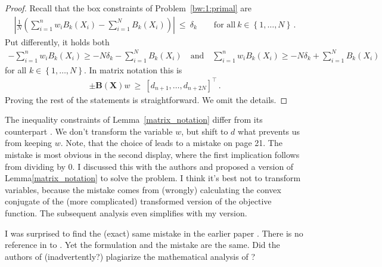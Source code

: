 \begin{proof}
  Recall that the box constraints of Problem~\ref{bw:1:primal} are
  \begin{gather*}
        \left| 
      \frac{1}{N} 
      \left( 
      \sum_{i = 1}^{n} 
      w_i
      B_k(X_i)
      -
      \sum_{i=1}^{N} 
      B_k(X_i)
      \right)
    \right|
    \ 
    \le 
    \ 
    \delta_k
    \qquad
    \text{for all}\ 
    k\in \left\{ 1,\ldots, N \right\}
    \,.
  \end{gather*}
  Put differently, it holds both
  \begin{align*}
    -
      \sum_{i = 1}^{n} 
      w_i
      B_k(X_i)
    \ge 
    -
    N
    \delta_k
      -
      \sum_{i=1}^{N} 
      B_k(X_i)
      \quad 
    \text{and}
      \quad
      \sum_{i = 1}^{n} 
      w_i
      B_k(X_i)
    \ge 
    -
    N
    \delta_k
      +
      \sum_{i=1}^{N} 
      B_k(X_i)
  \end{align*}
  for all 
  $
    k\in \left\{ 1,\ldots, N \right\}
  $. In matrix notation this is 
  \begin{gather*}
    \pm\mathbf{B}(\mathbf{X})w
    \ 
    \ge
    \ 
    [d_{n+1},\ldots, d_{n+  2 N}]^\top
    \,.
  \end{gather*}
  Proving the rest of the statements is straightforward. We omit the details.
\end{proof}
\begin{remark}
  The inequality constraints of
  Lemma~\ref{matrix_notation} differ from its counterpart
  \cite[Proof of Lemma~1]{Wang2019}.
  We don't transform the variable $w$, but shift to $d$ what prevents us from keeping $w$.
  Note, that the choice of
  \cite[Proof of Lemma~1]{Wang2019} leads to a mistake on page 21.
  The mistake is most obvious in the second display, where the first implication follows from dividing by 0.
  I discussed this with the authors and proposed a version of Lemma\ref{matrix_notation} to solve the problem. I think it's best not to transform variables, because the mistake comes from (wrongly) calculating the convex conjugate of the (more complicated) transformed version of the objective function. The subsequent analysis even simplifies with my version.

  I was surprised to find the (exact) same mistake in the earlier paper 
  \cite[page 35 second display]{Chan2016}. 
  There is no reference in
  \cite[Proof of Lemma~1]{Wang2019} 
  to
  \cite{Chan2016}. Yet the formulation and the mistake are the same.
  Did the authors of \cite{Wang2019} (inadvertently?) plagiarize
  the mathematical analysis of 
  \cite{Chan2016}
  ?
\end{remark}
